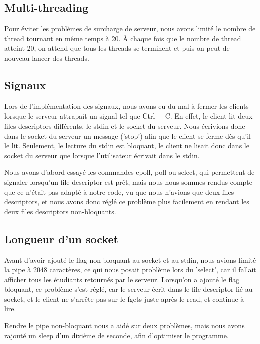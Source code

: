 \documentclass[utf8]{article}
\begin{document}
\begin{large}
\par
\subsection{Multi-threading}

\par 
\indent

Pour éviter les problèmes de surcharge de serveur, nous avons limité le nombre
de thread tournant en même temps à 20.
À chaque fois que le nombre de thread atteint 20, on attend que tous les threads se terminent 
et puis on peut de nouveau lancer des threads.
\par
\subsection{Signaux}
\par
\indent

Lors de l'implémentation des signaux, nous avons eu du mal à fermer les clients
lorsque le serveur attrapait un signal tel que Ctrl + C. En effet, le client lit
deux files descriptors différents, le stdin et le socket du serveur. Nous
écrivions donc dans le socket du serveur un message ('stop') afin que le client
se ferme dès qu'il le lit. Seulement, le lecture du stdin est bloquant, le
client ne lisait donc dans le socket du serveur que lorsque l'utilisateur
écrivait dans le stdin. 
\par
\par
Nous avons d'abord essayé les commandes epoll, poll ou select, qui permettent de
signaler lorsqu'un file descriptor est prêt, mais nous nous sommes rendus compte
que ce n'était pas adapté à notre code, vu que nous n'avions que deux files
descriptors, et nous avons donc réglé ce problème plus facilement en rendant les
deux files descriptors non-bloquants.
\par
\subsection{Longueur d'un socket}
\par
\indent

Avant d'avoir ajouté le flag non-bloquant au socket et au stdin, nous avions
limité la pipe à 2048 caractères, ce qui nous posait problème lors du 'select',
car il fallait afficher tous les étudiants retournés par le serveur. Lorsqu'on a
ajouté le flag bloquant, ce problème s'est réglé, car le serveur écrit dans le
file descriptor lié au socket, et le client ne s'arrête pas sur le fgets juste
après le read, et continue à lire.
\par
Rendre le pipe non-bloquant nous a aidé sur deux problèmes, mais nous avons
rajouté un sleep d'un dixième de seconde, afin d'optimiser le programme.
\par


\end{large}
\end{document}
